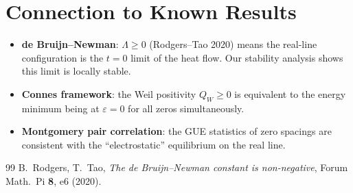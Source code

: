 \documentclass[11pt]{article}
\begin{document}
\section{Connection to Known Results}

\begin{itemize}
\item \textbf{de Bruijn--Newman}: $\Lambda \geq 0$ (Rodgers--Tao 2020) means the real-line configuration is the $t = 0$ limit of the heat flow. Our stability analysis shows this limit is locally stable.
\item \textbf{Connes framework}: the Weil positivity $Q_W \geq 0$ is equivalent to the energy minimum being at $\varepsilon = 0$ for all zeros simultaneously.
\item \textbf{Montgomery pair correlation}: the GUE statistics of zero spacings are consistent with the ``electrostatic'' equilibrium on the real line.
\end{itemize}

\begin{thebibliography}{99}
 B.~Rodgers, T.~Tao, \emph{The de Bruijn--Newman constant is non-negative}, Forum Math.\ Pi \textbf{8}, e6 (2020).
\end{thebibliography}
\end{document}
